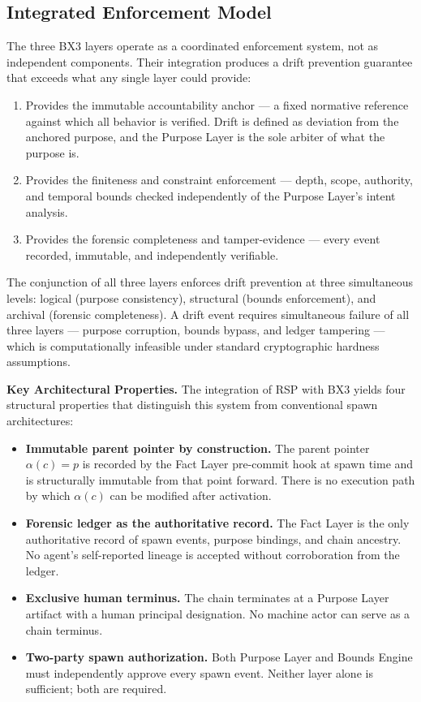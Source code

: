 \subsection{Integrated Enforcement Model}

The three BX3 layers operate as a coordinated enforcement system, not as independent components. Their integration produces a drift prevention guarantee that exceeds what any single layer could provide:

\begin{enumerate}
  \item[\textbf{Logical layer (Purpose Layer):}] Provides the immutable accountability anchor — a fixed normative reference against which all behavior is verified. Drift is defined as deviation from the anchored purpose, and the Purpose Layer is the sole arbiter of what the purpose is.
  \item[\textbf{Structural layer (Bounds Engine):}] Provides the finiteness and constraint enforcement — depth, scope, authority, and temporal bounds checked independently of the Purpose Layer's intent analysis.
  \item[\textbf{Archival layer (Fact Layer):}] Provides the forensic completeness and tamper-evidence — every event recorded, immutable, and independently verifiable.
\end{enumerate}

The conjunction of all three layers enforces drift prevention at three simultaneous levels: logical (purpose consistency), structural (bounds enforcement), and archival (forensic completeness). A drift event requires simultaneous failure of all three layers — purpose corruption, bounds bypass, and ledger tampering — which is computationally infeasible under standard cryptographic hardness assumptions.

\bigskip
\noindent\textbf{Key Architectural Properties.}
The integration of RSP with BX3 yields four structural properties that distinguish this system from conventional spawn architectures:

\begin{itemize}
  \item \textbf{Immutable parent pointer by construction.} The parent pointer $\alpha(c) = p$ is recorded by the Fact Layer pre-commit hook at spawn time and is structurally immutable from that point forward. There is no execution path by which $\alpha(c)$ can be modified after activation.
  \item \textbf{Forensic ledger as the authoritative record.} The Fact Layer is the only authoritative record of spawn events, purpose bindings, and chain ancestry. No agent's self-reported lineage is accepted without corroboration from the ledger.
  \item \textbf{Exclusive human terminus.} The chain terminates at a Purpose Layer artifact with a human principal designation. No machine actor can serve as a chain terminus.
  \item \textbf{Two-party spawn authorization.} Both Purpose Layer and Bounds Engine must independently approve every spawn event. Neither layer alone is sufficient; both are required.
\end{itemize}

